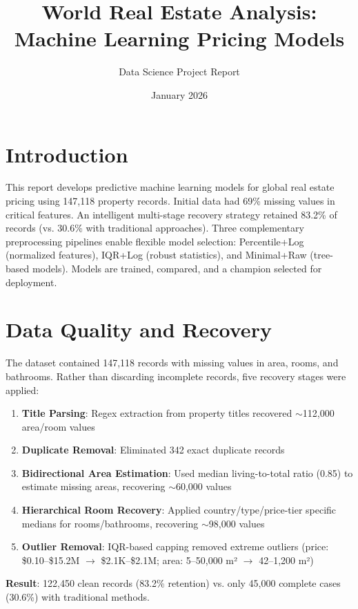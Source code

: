 \documentclass[12pt,a4paper]{article}
\title{\textbf{World Real Estate Analysis:\\Machine Learning Pricing Models}}
\author{Data Science Project Report}
\date{January 2026}
\begin{document}
\maketitle

\section{Introduction}

This report develops predictive machine learning models for global real estate pricing using 147,118 property records. Initial data had 69\% missing values in critical features. An intelligent multi-stage recovery strategy retained 83.2\% of records (vs. 30.6\% with traditional approaches). Three complementary preprocessing pipelines enable flexible model selection: Percentile+Log (normalized features), IQR+Log (robust statistics), and Minimal+Raw (tree-based models). Models are trained, compared, and a champion selected for deployment.

\section{Data Quality and Recovery}

The dataset contained 147,118 records with missing values in area, rooms, and bathrooms. Rather than discarding incomplete records, five recovery stages were applied:

\begin{enumerate}
    \item \textbf{Title Parsing}: Regex extraction from property titles recovered $\sim$112,000 area/room values
    \item \textbf{Duplicate Removal}: Eliminated 342 exact duplicate records
    \item \textbf{Bidirectional Area Estimation}: Used median living-to-total ratio (0.85) to estimate missing areas, recovering $\sim$60,000 values
    \item \textbf{Hierarchical Room Recovery}: Applied country/type/price-tier specific medians for rooms/bathrooms, recovering $\sim$98,000 values  
    \item \textbf{Outlier Removal}: IQR-based capping removed extreme outliers (price: \$0.10--\$15.2M $\rightarrow$ \$2.1K--\$2.1M; area: 5--50,000 m² $\rightarrow$ 42--1,200 m²)
\end{enumerate}

\textbf{Result}: 122,450 clean records (83.2\% retention) vs. only 45,000 complete cases (30.6\%) with traditional methods.
\end{document}
